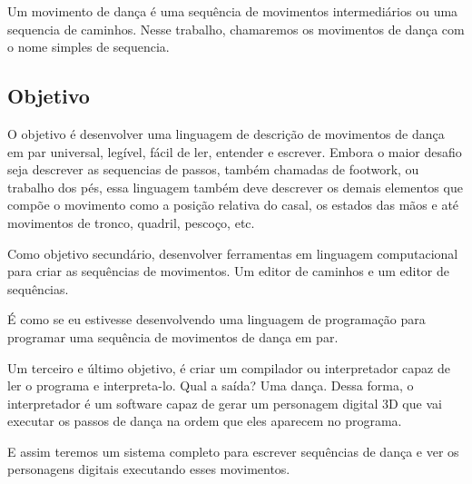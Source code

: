Um movimento de dança é uma sequência de movimentos intermediários ou uma sequencia de caminhos. Nesse trabalho, chamaremos os movimentos de dança com o nome simples de sequencia.


\subsection{Objetivo}

O objetivo é desenvolver uma linguagem de descrição de movimentos de dança em par universal, legível, fácil de ler, entender e escrever. Embora o maior desafio seja descrever as sequencias de  passos, também chamadas de footwork, ou trabalho dos pés, essa linguagem também deve descrever os demais elementos que compõe o movimento como a posição relativa do casal, os estados das mãos e até movimentos de tronco, quadril, pescoço, etc.

Como objetivo secundário, desenvolver ferramentas em linguagem computacional para criar as sequências de movimentos. Um editor de caminhos e um editor de sequências.

É como se eu estivesse desenvolvendo uma linguagem de programação para programar uma sequência de movimentos de dança em par.

Um terceiro e último objetivo, é criar um compilador ou interpretador capaz de ler o programa e interpreta-lo. Qual a saída? Uma dança. Dessa forma, o interpretador é um software capaz de gerar um personagem digital 3D que vai executar os passos de dança na ordem que eles aparecem no programa. 

E assim teremos um sistema completo para escrever sequências de dança e ver os personagens digitais executando esses movimentos.




 



